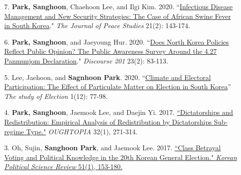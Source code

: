\documentclass[margin,line]{res}
\begin{document}
\begin{resume}
\begin{enumerate}[leftmargin=*]
\item[7.] \textbf{Park, Sanghoon}, Chaehoon Lee, and Ilgi Kim. 2020. ``\href{https://www.earticle.net/Journal/Issues/511/28448}{Infectious Disease Management and New Security Strategies: The Case of African Swine Fever in South Korea}." \textit{The Journal of Peace Studies} 21(2): 143-174.
\item[6.] \textbf{Park, Sanghoon}, and Jaeyoung Hur. 2020. ``\href{http://www.discourse201.org/html/sub05_01.asp}{Does North Korea Policies Reflect Public Opinion? The Public Awareness Survey Around the 4.27 Panmunjom Declaration}." \textit{Discourse 201} 23(2): 83-113.
\item[5.] Lee, Jaehoon, and \textbf{Sagnhoon Park}. 2020. ``\href{https://m.nec.go.kr/portal/cmm/fms/FileDown.do?atchFileId=5d0ffae936edc42f3b4e864801f86a0f4096c44da03fede418b94067e8f9d0ea&fileSn=1&bbsId=&searchYear=}{Climate and Electoral Participation: The Effect of Particulate Matter on Election in South Korea}'' \textit{The study of Election} 1(12): 77-98.  
\item[4.] \textbf{Park, Sanghoon}, Jaemook Lee, and Daejin Yi. 2017. \href{http://www.dbpia.co.kr/Journal/ArticleDetail/NODE07183479?TotalCount=1&Seq=1&q=%5B%EB%8F%85%EC%9E%AC%EA%B5%AD%EA%B0%80%EC%99%80%20%EC%9E%AC%EB%B6%84%EB%B0%B0%C2%A7coldb%C2%A72%C2%A751%C2%A73%5D&searchWord=%EC%A0%84%EC%B2%B4%3D%5E%24%EB%8F%85%EC%9E%AC%EA%B5%AD%EA%B0%80%EC%99%80%20%EC%9E%AC%EB%B6%84%EB%B0%B0%5E*&Multimedia=0&isIdentifyAuthor=0&Collection=0&SearchAll=%EB%8F%85%EC%9E%AC%EA%B5%AD%EA%B0%80%EC%99%80%20%EC%9E%AC%EB%B6%84%EB%B0%B0&isFullText=0&specificParam=0&SearchMethod=0&Sort=1&SortType=desc&Page=1&PageSize=20#}{``Dictatorships and Redistribution: Empirical Analysis of Redistribution by Dictatorships Sub-regime Type."} \textit{OUGHTOPIA} 32(1), 271-314.
\item[3.] Oh, Sujin, \textbf{Sanghoon Park}, and Jaemook Lee. 2017. \href{http://www.dbpia.co.kr/Journal/ArticleDetail/NODE07131578?TotalCount=1&Seq=1&q=%5B%EC%9D%B4%EC%9E%AC%EB%AC%B5%20%EC%98%A4%EC%88%98%EC%A7%84%20%EB%B0%95%EC%83%81%ED%9B%88%20%EA%B3%84%EA%B8%89%ED%88%AC%ED%91%9C%C2%A7coldb%C2%A72%C2%A751%C2%A73%5D&searchWord=%EC%A0%84%EC%B2%B4%3D%5E%24%EC%9D%B4%EC%9E%AC%EB%AC%B5%20%EC%98%A4%EC%88%98%EC%A7%84%20%EB%B0%95%EC%83%81%ED%9B%88%20%EA%B3%84%EA%B8%89%ED%88%AC%ED%91%9C%5E*&Multimedia=0&isIdentifyAuthor=0&Collection=0&SearchAll=%EC%9D%B4%EC%9E%AC%EB%AC%B5%20%EC%98%A4%EC%88%98%EC%A7%84%20%EB%B0%95%EC%83%81%ED%9B%88%20%EA%B3%84%EA%B8%89%ED%88%AC%ED%91%9C&isFullText=0&specificParam=0&SearchMethod=0&Sort=1&SortType=desc&Page=1&PageSize=20#}{``Class Betrayal Voting and Political Knowledge in the 20th Korean General Election." \textit{Korean Political Science Review} 51(1), 153-180.}

\end{enumerate}
\end{resume}
\end{document}
